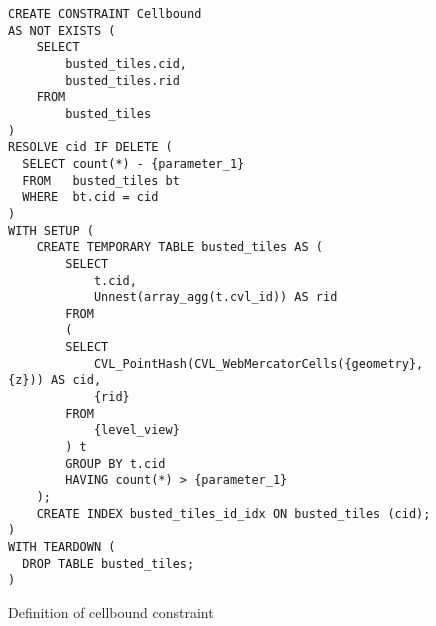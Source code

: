 \begin{figure}[htbp]
\begin{center}
\begin{lstlisting}
CREATE CONSTRAINT Cellbound
AS NOT EXISTS (
    SELECT
        busted_tiles.cid,
        busted_tiles.rid
    FROM
        busted_tiles
)
RESOLVE cid IF DELETE (
  SELECT count(*) - {parameter_1}
  FROM   busted_tiles bt
  WHERE  bt.cid = cid
)
WITH SETUP (
    CREATE TEMPORARY TABLE busted_tiles AS (
        SELECT
            t.cid,
            Unnest(array_agg(t.cvl_id)) AS rid
        FROM
        (
        SELECT
            CVL_PointHash(CVL_WebMercatorCells({geometry}, {z})) AS cid,
            {rid}
        FROM
            {level_view}
        ) t
        GROUP BY t.cid
        HAVING count(*) > {parameter_1}
    );
    CREATE INDEX busted_tiles_id_idx ON busted_tiles (cid);
)
WITH TEARDOWN (
  DROP TABLE busted_tiles;
)
\end{lstlisting}
\caption{Definition of cellbound constraint}
\label{fig:cellbound-definition}
\end{center}
\end{figure}


